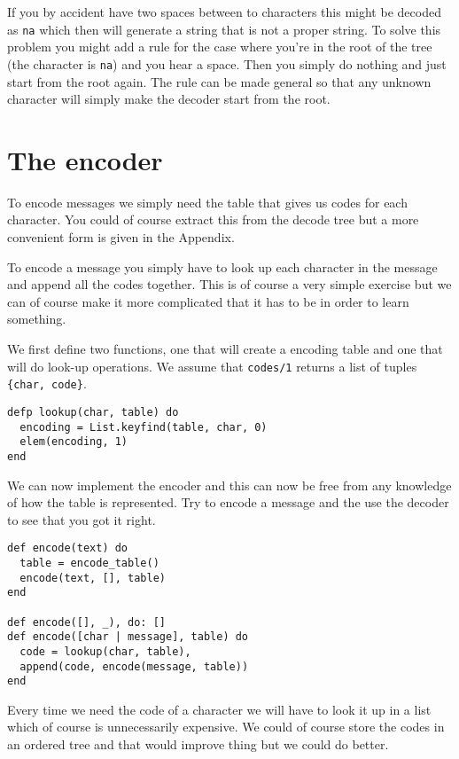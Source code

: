 \documentclass[a4paper,11pt]{article}
\begin{document}
If you by accident have two spaces between to characters this might be
decoded as {\tt na} which then will generate a string that is not a
proper string. To solve this problem you might add a rule for the case
where you're in the root of the tree (the character is {\tt na}) and
you hear a space. Then you simply do nothing and just start from the
root again. The rule can be made general so that any unknown character
will simply make the decoder start from the root.



\section{The encoder}

To encode messages we simply need the table that gives us codes for
each character. You could of course extract this from the decode tree
but a more convenient form is given in the Appendix. 

To encode a message you simply have to look up each character in the
message and append all the codes together. This is of course a very
simple exercise but we can of course make it more complicated that it
has to be in order to learn something.

We first define two functions, one that will create a encoding table
and one that will do look-up operations. We assume that {\tt codes/1}
returns a list of tuples {\tt\{char, code\}}.

\begin{verbatim}
defp lookup(char, table) do
  encoding = List.keyfind(table, char, 0)
  elem(encoding, 1)
end
\end{verbatim}

We can now implement the encoder and this can now be free from any
knowledge of how the table is represented. Try to encode a message and
the use the decoder to see that you got it right.

\begin{verbatim}
def encode(text) do
  table = encode_table()
  encode(text, [], table)
end

def encode([], _), do: []
def encode([char | message], table) do 
  code = lookup(char, table),
  append(code, encode(message, table))
end
\end{verbatim}

Every time we need the code of a character we will have
to look it up in a list which of course is unnecessarily expensive.  We
could of course store the codes in an ordered tree and that would
improve thing but we could do better.
\end{document}
